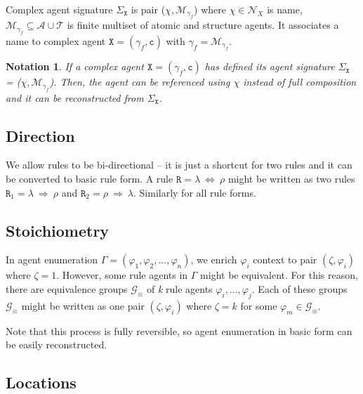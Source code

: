 \documentclass{entcs}
\renewcommand{\~}[0]{\texttildelow}
\newtheorem{notation}[thm]{Notation}
\begin{document}
\begin{defn}
Complex agent signature $\Sigma_\mathtt{X}$ is pair ($\chi, \mathcal{M}_{\gamma_f}$) where $\chi \in \mathcal{N}_{X}$ is name, $\mathcal{M}_{\gamma_f} \subseteq \mathcal{A} \cup \mathcal{T}$ is finite multiset of atomic and structure agents. It associates a name to complex agent $\mathtt{X} = (\gamma_f, \mathtt{c})$ with $\gamma_f = \mathcal{M}_{\gamma_f}$.
\end{defn}

\begin{notation}
If a complex agent $\mathtt{X} = (\gamma_f, \mathtt{c})$ has defined its agent signature $\Sigma_\mathtt{X}$ = ($\chi, \mathcal{M}_{\gamma_f}$). Then, the agent can be referenced using $\chi$ instead of full composition and it can be reconstructed from $\Sigma_\mathtt{X}$.
\end{notation}

\subsection{Direction}

We allow rules to be bi-directional -- it is just a shortcut for two rules and it can be converted to basic rule form. A rule $\mathtt{R} = \lambda ~\Leftrightarrow~ \rho$ might be written as two rules $\mathtt{R}_1 = \lambda ~\Rightarrow~ \rho$ and $\mathtt{R}_2 = \rho ~\Rightarrow~ \lambda$. Similarly for all rule forms.

\subsection{Stoichiometry}

In agent enumeration $\Gamma = (\varphi_1, \varphi_2, ..., \varphi_n)$, we enrich $\varphi_i$ context to pair $(\zeta, \varphi_i)$ where $\zeta = 1$. However, some rule agents in $\Gamma$ might be equivalent. For this reason, there are equivalence groups $\mathcal{G}_\equiv$ of \textit{k} rule agents $\varphi_i, ..., \varphi_j$. Each of these groups $\mathcal{G}_\equiv$ might be written as one pair $(\zeta, \varphi_i)$ where $\zeta = k$ for some $\varphi_m \in \mathcal{G}_\equiv$.

Note that this process is fully reversible, so agent enumeration in basic form can be easily reconstructed.

\subsection{Locations}
\end{document}
